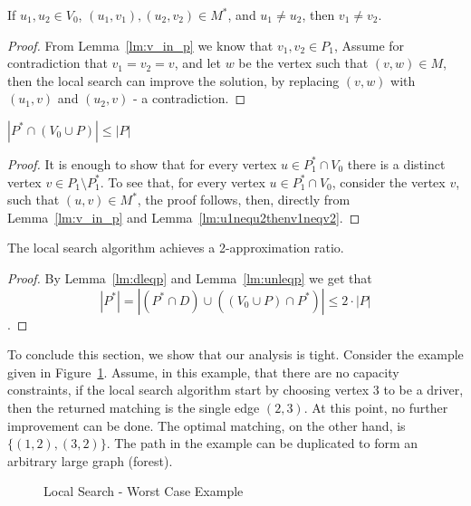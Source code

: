 \begin{lemma}
\label{lm:u1nequ2thenv1neqv2}
If $u_1, u_2 \in V_0$, 
$(u_1, v_1), (u_2, v_2) \in M^*$, 
and $u_1 \neq u_2$,
then $v_1 \neq v_2$.
\end{lemma}

\begin{proof}
From Lemma~\ref{lm:v_in_p} we know that $v_1, v_2 \in P_1$,
Assume for contradiction that $v_1 = v_2 = v$,
and let $w$ be the vertex such that $(v, w) \in M$,
then the local search can improve the solution, 
by replacing $(v, w)$ with $(u_1, v)$ and $(u_2, v)$ - a contradiction.
\end{proof}

\begin{lemma}
\label{lm:unleqp}
$|P^* \cap (V_0 \cup P)| \leq |P|$
\end{lemma}

\begin{proof}
It is enough to show that for every vertex $u \in P^*_1 \cap V_0$
there is a distinct vertex $v \in P_1 \setminus P^*_1$.
To see that, for every vertex $u \in P^*_1 \cap V_0$, 
consider the vertex $v$, such that $(u, v) \in M^*$, 
the proof follows, then, directly
from Lemma~\ref{lm:v_in_p} and Lemma~\ref{lm:u1nequ2thenv1neqv2}.  
\end{proof}


\begin{theorem}
The local search algorithm achieves a 2-approximation ratio.
\end{theorem}

\begin{proof}
By Lemma~\ref{lm:dleqp} and Lemma~\ref{lm:unleqp} we get that 
$$
|P^*| = 
|(P^* \cap D) \cup ((V_0 \cup P) \cap P^*)| \leq 2 \cdot |P|
$$.
\end{proof}

To conclude this section, we show that our analysis is tight.
Consider the example given in Figure~\ref{fig:localtight}.
Assume, in this example, that there are no capacity constraints,
if the local search algorithm start by choosing vertex $3$ to be a driver, 
then the returned matching is the single edge $(2,3)$.
At this point, no further improvement can be done.
The optimal matching, on the other hand, is $\{(1, 2), (3, 2)\}$. 
The path in the example can be duplicated to form an arbitrary large graph (forest).

\begin{figure} 

\caption{
\label{fig:localtight}
Local Search - Worst Case Example
}
\end{figure}